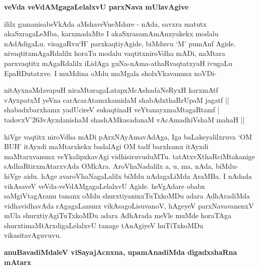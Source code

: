 {\bigskip
\noindent
{\large\bf veVda veVdAMgagaLelalxvU parxNava mUlavAgive}}\label{165}
\medskip

\noindent
ililx gamanisabeVkAda aMshaveVneMdare - nAda, savxra matutx akaSxragaLeMba, karxmadaMte I akaSxrasamA\-mAnxyakekx modalu nAdAdigaLu. visagaRvu`H' parxkaqtiyAgide, biMduvu `M' pumAnf Agide. nivaqtitx\-mAgaRdalilx horaTu modalu vaqtitxniroVdha mADi, naMtara parxvaqtitx mAgaRdalilx iLidAga guNa-\-nAma-\-athaRvaqtatxyaH ivugaLu EpaRDutatxve. I muMdina oMdu maMgala sholxVkavanunx noVDi-

\begin{shloka}
nitAyxnaMdavapuH niraMtaragaLatapxMcAshadaNeRyxH karxmAtf\\\label{165}
vAyxpatxM yeVna carAcarAtamxkamidaM shabAdxthaRrUpaM jagatf ||\\
shabadxbarxhamx yadUcireV sukaqtinaH veYtanayxmaMtagaRtamf |\\
tadovxV\char'263vAyxdanishaM shashAMkasadanaM vAcAmadhiVshaM mahaH ||
\end{shloka}

hiVge vaqtitx niroVdha mADi pArxNAyAmavAdAga, Iga baLakeyalilxruva `OM BUH' itAyxdi maMtarxkekx\- badalAgi OM tadf barxhamx itAyxdi maMtarxvanunx veYkalipxkavAgi vidhisiruvuduMTu. tatAtxvXthaRciMtaka\-nige sAdhaRtirxmAtarxvAda OMkAra. AroVhaNadalilx a, u, ma, nAda, biMdu- hiVge aidu. hAge avaroVhaNagaLalilx biMdu nAdagaLiMda AraMBa. I nAdada vikAsaveV veVda-veVdAMgagaLelalxvU Agide. heVgAdare obabx saMgiVtagAranu tananx oMdu shurxtiyaninxTuTxkoMDu adara AdhAradiMda vidhavidhavAda rAgagaLanunx vikAsagoLisuvanoV, hAgeyeV parxNavavanenxV mUla shurxtiyAgiTuTxkoMDu adara AdhArada meVle muMde horaTAga shurxtimaMtArxdigaLelalxvU tanage tAnAgiyeV huTiTxkoMDu vikasitavAguvuvu.

{\bigskip
\noindent
{\large\bf anuBavadiMdaleV viSayajAcnxna, upamAnadiMda digadxshaRna mAtarx}}\label{page166}
\medskip

